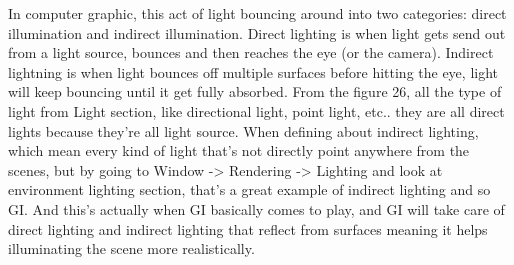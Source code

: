 \documentclass[a4paper, 13pt]{extarticle}
\begin{document}
{ In computer graphic, this act of light bouncing around into two categories: direct illumination and indirect illumination. Direct lighting is when light gets send out from a light source, bounces and then reaches the eye (or the camera). Indirect lightning is when light bounces off multiple surfaces before hitting the eye, light will keep bouncing until it get fully absorbed. From the figure 26, all the type of light from Light section, like directional light, point light, etc.. they are all direct lights because they're all light source. When defining about indirect lighting, which mean every kind of light that's not directly point anywhere from the scenes, but by going to Window -> Rendering -> Lighting and look at environment lighting section, that's a great example of indirect lighting and so GI. And this's actually when GI basically comes to play, and GI will take care of direct lighting and indirect lighting that reflect from surfaces meaning it helps illuminating the scene more realistically. 
 \begin{figure}[h]
 	

\end{figure}}
\end{document}
